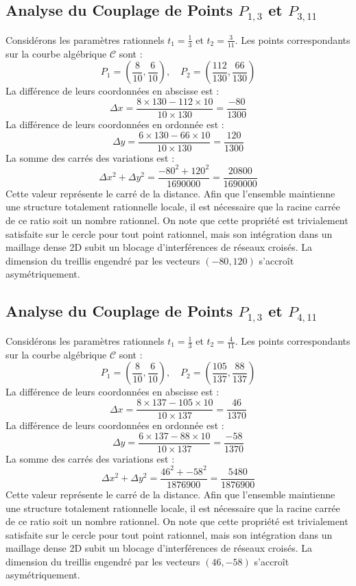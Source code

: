 \documentclass[12pt, a4paper]{article}
\begin{document}
\subsection{Analyse du Couplage de Points $P_{1,3}$ et $P_{3,11}$}
Considérons les paramètres rationnels $t_1 = \frac{1}{3}$ et $t_2 = \frac{3}{11}$.
Les points correspondants sur la courbe algébrique $\mathcal{C}$ sont :
$$ P_1 = \left( \frac{8}{10}, \frac{6}{10} \right), \quad P_2 = \left( \frac{112}{130}, \frac{66}{130} \right) $$
La différence de leurs coordonnées en abscisse est :
$$ \Delta x = \frac{8 \times 130 - 112 \times 10}{10 \times 130} = \frac{-80}{1300} $$
La différence de leurs coordonnées en ordonnée est :
$$ \Delta y = \frac{6 \times 130 - 66 \times 10}{10 \times 130} = \frac{120}{1300} $$
La somme des carrés des variations est :
$$ \Delta x^2 + \Delta y^2 = \frac{ -80^2 + 120^2 }{ 1690000 } = \frac{ 20800 }{ 1690000 } $$
Cette valeur représente le carré de la distance. Afin que l'ensemble maintienne une structure totalement rationnelle locale, il est nécessaire que la racine carrée de ce ratio soit un nombre rationnel. On note que cette propriété est trivialement satisfaite sur le cercle pour tout point rationnel, mais son intégration dans un maillage dense 2D subit un blocage d'interférences de réseaux croisés. La dimension du treillis engendré par les vecteurs $( -80, 120 )$ s'accroît asymétriquement.


\subsection{Analyse du Couplage de Points $P_{1,3}$ et $P_{4,11}$}
Considérons les paramètres rationnels $t_1 = \frac{1}{3}$ et $t_2 = \frac{4}{11}$.
Les points correspondants sur la courbe algébrique $\mathcal{C}$ sont :
$$ P_1 = \left( \frac{8}{10}, \frac{6}{10} \right), \quad P_2 = \left( \frac{105}{137}, \frac{88}{137} \right) $$
La différence de leurs coordonnées en abscisse est :
$$ \Delta x = \frac{8 \times 137 - 105 \times 10}{10 \times 137} = \frac{46}{1370} $$
La différence de leurs coordonnées en ordonnée est :
$$ \Delta y = \frac{6 \times 137 - 88 \times 10}{10 \times 137} = \frac{-58}{1370} $$
La somme des carrés des variations est :
$$ \Delta x^2 + \Delta y^2 = \frac{ 46^2 + -58^2 }{ 1876900 } = \frac{ 5480 }{ 1876900 } $$
Cette valeur représente le carré de la distance. Afin que l'ensemble maintienne une structure totalement rationnelle locale, il est nécessaire que la racine carrée de ce ratio soit un nombre rationnel. On note que cette propriété est trivialement satisfaite sur le cercle pour tout point rationnel, mais son intégration dans un maillage dense 2D subit un blocage d'interférences de réseaux croisés. La dimension du treillis engendré par les vecteurs $( 46, -58 )$ s'accroît asymétriquement.
\end{document}
